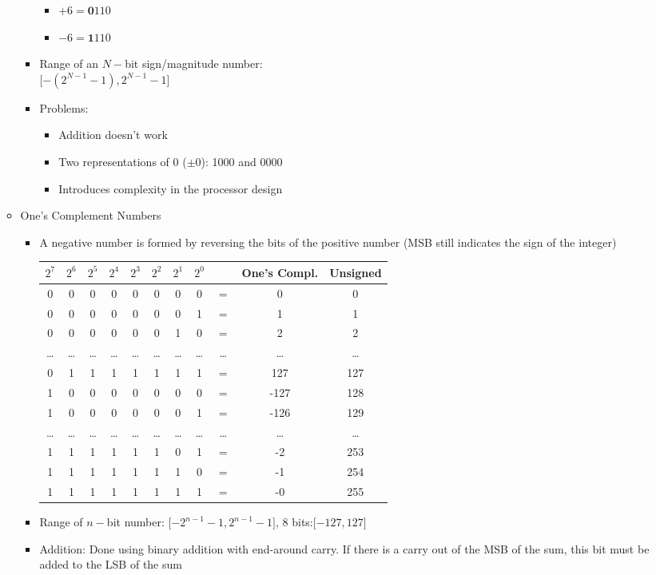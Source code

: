 \documentclass[a4paper]{article}
\begin{document}
\begin{itemize}
\begin{itemize}
\begin{itemize}
\begin{itemize}
\item $+6=\textbf{0}110$
\item $-6=\textbf{1}110$
\end{itemize}
\item Range of an $N-$bit sign/magnitude number:\\
$\lbrack -\left( 2^{N-1}-1\right),2^{N-1}-1\rbrack$
\item Problems:
\begin{itemize}
\item Addition doesn't work
\item Two representations of 0 ($\pm 0$): 1000 and 0000
\item Introduces complexity in the processor design
\end{itemize}
\end{itemize}
\item One's Complement Numbers
\begin{itemize}
\item A negative number is formed by reversing the bits of the positive number (MSB still indicates the sign of the integer)\\
\begin{tabular}{|c|c|c|c|c|c|c|c|c|c|c|}
\hline
$2^7$&$2^6$&$2^5$&$2^4$&$2^3$&$2^2$&$2^1$&$2^0$&{}&One's Compl.&Unsigned\\\hline\hline
0&0&0&0&0&0&0&0&$=$&0&0\\
0&0&0&0&0&0&0&1&$=$&1&1\\
0&0&0&0&0&0&1&0&$=$&2&2\\
\dots&\dots&\dots&\dots&\dots&\dots&\dots&\dots&\dots&\dots&\dots\\
0&1&1&1&1&1&1&1&$=$&127&127\\
1&0&0&0&0&0&0&0&$=$&-127&128\\
1&0&0&0&0&0&0&1&$=$&-126&129\\
\dots&\dots&\dots&\dots&\dots&\dots&\dots&\dots&\dots&\dots&\dots\\
1&1&1&1&1&1&0&1&$=$&-2&253\\
1&1&1&1&1&1&1&0&$=$&-1&254\\
1&1&1&1&1&1&1&1&$=$&-0&255\\\hline
\end{tabular}
\item Range of $n-$bit number: $\lbrack -2^{n-1}-1,2^{n-1}-1\rbrack$, 8 bits:$\lbrack -127,127\rbrack$
\item Addition: Done using binary addition with end-around carry. If there is a carry out of the MSB of the sum, this bit must be added to the LSB of the sum

\end{itemize}
\end{itemize}
\end{itemize}
\end{document}
